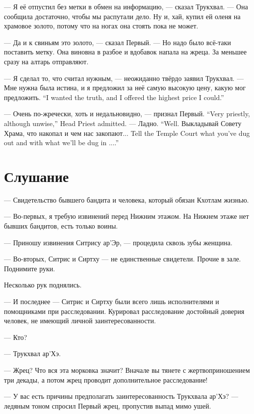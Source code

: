 --- Я её отпустил без метки в обмен на информацию, --- сказал Трукхвал.
--- Она сообщила достаточно, чтобы мы распутали дело.
Ну и, хай, купил ей оленя на храмовое золото, потому что на ногах она стоять пока не может.

--- Да и к свиньям это золото, --- сказал Первый.
--- Но надо было всё-таки поставить метку.
Она виновна в разбое и вдобавок напала на жреца.
За меньшее сразу на алтарь отправляют.

--- Я сделал то, что считал нужным, --- неожиданно твёрдо заявил Трукхвал.
{--- Мне нужна была истина, и я предложил за неё самую высокую цену, какую мог предложить.}
{``I wanted the truth, and I offered the highest price I could.''}

{--- Очень по-жречески, хоть и недальновидно, --- признал Первый.}
{``Very priestly, although unwise,'' Head Priest admitted.}
{--- Ладно.}
{``Well.}
{Выкладывай Совету Храма, что накопал и чем нас закопают...}
{Tell the Temple Court what you've dug out and with what we'll be dug in ....''}

\section{Слушание}

--- Свидетельство бывшего бандита и человека, который обязан Кхотлам жизнью.

--- Во-первых, я требую извинений перед Нижним этажом.
На Нижнем этаже нет бывших бандитов, есть только воины.

--- Приношу извинения Ситрису ар'Эр, --- процедила сквозь зубы женщина.

--- Во-вторых, Ситрис и Сиртху --- не единственные свидетели.
Прочие в зале.
Поднимите руки.

Несколько рук поднялись.

--- И последнее --- Ситрис и Сиртху были всего лишь исполнителями и помощниками при расследовании.
Курировал расследование достойный доверия человек, не имеющий личной заинтересованности.

--- Кто?

--- Трукхвал ар'Хэ.

--- Жрец?
Что вся эта морковка значит?
Вначале вы тянете с жертвоприношением три декады, а потом жрец проводит дополнительное расследование!

--- У вас есть причины предполагать заинтересованность Трукхвала ар'Хэ? --- ледяным тоном спросил Первый жрец, пропустив выпад мимо ушей.

